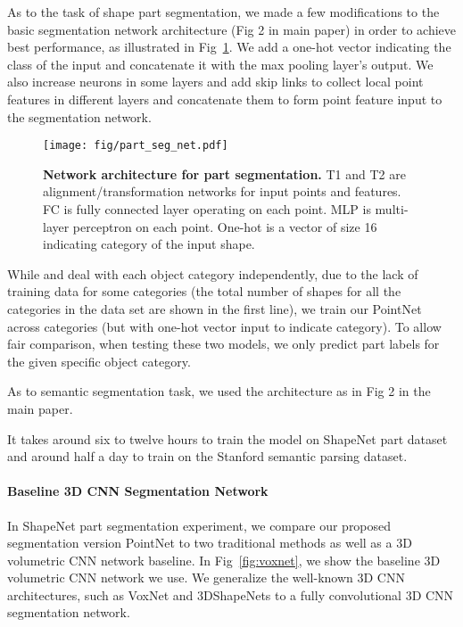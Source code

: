 \documentclass[10pt,twocolumn,letterpaper]{article}
\begin{document}
As to the task of shape part segmentation, we made a few modifications to the basic segmentation network architecture (Fig 2 in main paper) in order to achieve best performance, as illustrated in Fig~\ref{fig:part_seg_net}. We add a one-hot vector indicating the class of the input and concatenate it with the max pooling layer's output. We also increase neurons in some layers and add skip links to collect local point features in different layers and concatenate them to form point feature input to the segmentation network.

\begin{figure}
\centering
\texttt{[image: fig/part\_seg\_net.pdf]}
\caption{\textbf{Network architecture for part segmentation.} T1 and T2 are alignment/transformation networks for input points and features. FC is fully connected layer operating on each point. MLP is multi-layer perceptron on each point. One-hot is a vector of size 16 indicating category of the input shape.}
\label{fig:part_seg_net}
\end{figure}

While \cite{Wu2014248} and \cite{Yi16} deal with each object category independently, due to the lack of training data for some categories (the total number of shapes for all the categories in the data set are shown in the first line), we train our PointNet across categories (but with one-hot vector input to indicate category). To allow fair comparison, when testing these two models, we only predict part labels for the given specific object category. 

As to semantic segmentation task, we used the architecture as in Fig 2 in the main paper.

It takes around six to twelve hours to train the model on ShapeNet part dataset and around half a day to train on the Stanford semantic parsing dataset.

\paragraph{Baseline 3D CNN Segmentation Network}
In ShapeNet part segmentation experiment, we compare our proposed segmentation version PointNet to two traditional methods as well as a 3D volumetric CNN network baseline. In Fig~\ref{fig:voxnet}, we show the baseline 3D volumetric CNN network we use. We generalize the well-known 3D CNN architectures, such as VoxNet \cite{maturana2015voxnet} and 3DShapeNets \cite{wu20153d} to a fully convolutional 3D CNN segmentation network.
\end{document}
